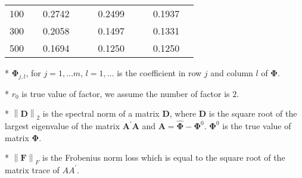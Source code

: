 \documentclass[12pt,a4paper,hyperref]{article}
\begin{document}
\begin{table}[H]
\begin{threeparttable}
\begin{tabular} {*{10}{c}}
\cmidrule(lr){1-4}   \cmidrule(lr){5-7}   \cmidrule(lr){8-10}
100& &0.2742& &  & 0.2499& & &0.1937 & \\
300& &0.2058 & &  & 0.1497& & &0.1331 &\\
500& &0.1694& &  &0.1250 & & &0.1250 & \\
\bottomrule
\end{tabular}
\begin{tablenotes}
\footnotesize
  \item[*] $\boldsymbol{\Phi}_{j,l}$, for $j=1,\ldots m$, $l=1,\ldots$ is the coefficient in row $j$ and column $l$ of $\boldsymbol{\Phi}$.
\item[*] $r_{0}$ is true value of factor, we assume the number of factor is $2$.
 \item[*] $\left\| \boldsymbol{D} \right\|_{2}$ is the spectral norm of a matrix $\boldsymbol{D}$, where $\boldsymbol{D}$ is the square root of the largest eigenvalue of the matrix $\boldsymbol{A}^{'}\boldsymbol{A}$ and $\boldsymbol{A}=\hat{\boldsymbol{\Phi}}- \boldsymbol{\Phi}^{0}$. $\boldsymbol{\Phi}^{0}$ is the true value of matrix $\boldsymbol{\Phi}$.
 \item[*] $\left\| \boldsymbol{F} \right\|_{F} $ is the Frobenius norm loss which is equal to the square root of the matrix trace of $AA^{'}$.
    \end{tablenotes}
\end{threeparttable}
\end{table}
\end{document}
